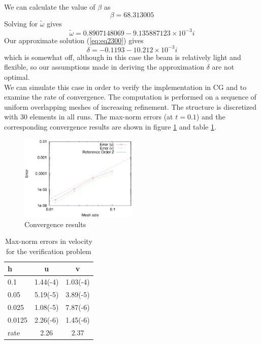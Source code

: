 \documentclass{article}
\begin{document}
We can calculate the value of $\beta$ as 
\[ \beta = 68.313005 \]
Solving for $\tilde{\omega}$ gives
\[ \tilde{\omega} =  0.8907148069 - 9.135887123 \times 10^{-3}i \]
Our approximate solution (\ref{eq:eq2300}) gives
\[ \delta = -0.1193 - 10.212 \times 10^{-3} i \]
which is somewhat off, although in this case the beam is relatively light and flexible, so our assumptions made in deriving the approximation $\delta$ are not optimal. \\
We can simulate this case in order to verify the implementation in CG and to examine the rate of convergence.  
The computation is performed on a sequence of uniform overlapping meshes of increasing refinement. 
The structure is discretized with $30$ elements in all runs. 
The max-norm errors (at $t=0.1$) and the corresponding convergence results are shown in figure \ref{fig:ExactSolutionConvergence} and table \ref{tbl:ExactSolutionConvergenceTable}.
\begin{figure}[ht]
        \centering
        \includegraphics[width=0.5\textwidth]{convergence} 
        \caption{Convergence results}
        \label{fig:ExactSolutionConvergence}
\end{figure}
\begin{table}
\centering
\begin{tabular}{ |l |  c | c| }
  \hline 
  h      & u        & v \\
  \hline 
  0.1    & 1.44(-4) & 1.03(-4) \\
  0.05   & 5.19(-5) & 3.89(-5) \\
  0.025  & 1.08(-5) & 7.87(-6) \\
  0.0125 & 2.26(-6) & 1.45(-6) \\
  \hline 
   rate   & 2.26     & 2.37 \\
  \hline 
\end{tabular}
\caption{Max-norm errors in velocity for the verification problem}
\label{tbl:ExactSolutionConvergenceTable}
\end{table}
\end{document}
